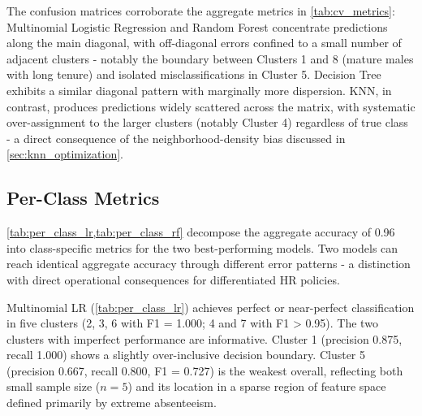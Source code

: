 \documentclass[alpha-refs,english]{RBCA_v3.0}
\begin{document}
The confusion matrices corroborate the aggregate metrics in 
\cref{tab:cv_metrics}: Multinomial Logistic Regression and Random Forest 
concentrate predictions along the main diagonal, with off-diagonal errors 
confined to a small number of adjacent clusters - notably the boundary between 
Clusters 1 and 8 (mature males with long tenure) and isolated misclassifications 
in Cluster 5. Decision Tree exhibits a similar diagonal pattern with marginally 
more dispersion. KNN, in contrast, produces predictions widely scattered across 
the matrix, with systematic over-assignment to the larger clusters (notably 
Cluster 4) regardless of true class - a direct consequence of the 
neighborhood-density bias discussed in \cref{sec:knn_optimization}.

\subsection{Per-Class Metrics}

\cref{tab:per_class_lr,tab:per_class_rf} decompose the aggregate accuracy 
of 0.96 into class-specific metrics for the two best-performing models. 
Two models can reach identical aggregate accuracy through different error 
patterns - a distinction with direct operational consequences for 
differentiated HR policies.

Multinomial LR (\cref{tab:per_class_lr}) achieves perfect or near-perfect 
classification in five clusters (2, 3, 6 with F1 = 1.000; 4 and 7 with 
F1 > 0.95). The two clusters with imperfect performance are informative. 
Cluster 1 (precision 0.875, recall 1.000) shows a slightly over-inclusive 
decision boundary. Cluster 5 (precision 0.667, recall 0.800, F1 = 0.727) 
is the weakest overall, reflecting both small sample size ($n = 5$) and 
its location in a sparse region of feature space defined primarily by 
extreme absenteeism.
\end{document}
